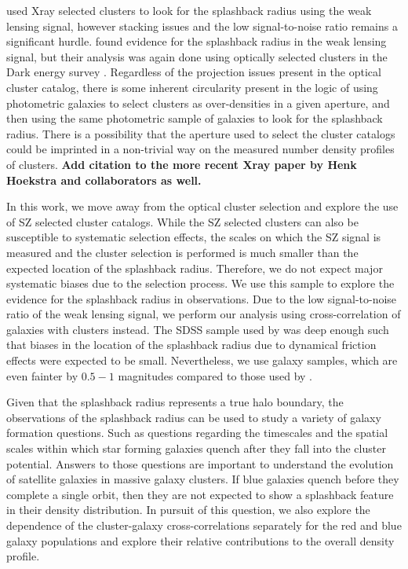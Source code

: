 \documentclass[iop, apjl, twocolappendix, numberedappendix]{emulateapj}
\begin{document}
\citet{umetsu2017lensing} used Xray selected clusters to look for
the splashback radius using the weak lensing signal, however
stacking issues and the low signal-to-noise ratio remains a significant
hurdle. \citet{chang2017splashback} found evidence for the splashback
radius in the weak lensing signal, but their analysis was again done
using optically selected clusters in the Dark energy survey
\citep{dark2005dark}. Regardless of the projection issues present in
the optical cluster catalog, there is some inherent circularity
present in the logic of using photometric galaxies to select
clusters as over-densities in a given aperture, and then using the
same photometric sample of galaxies to look for the splashback
radius. There is a possibility that the aperture used to select the
cluster catalogs could be imprinted in a non-trivial way on the measured number
density profiles of clusters. {\bf Add citation to the more recent Xray paper
by Henk Hoekstra and collaborators as well.}

In this work, we move away from the optical cluster selection and
explore the use of SZ selected cluster catalogs. While the SZ
selected clusters can also be susceptible to systematic selection
effects, the scales on which the SZ signal is measured and the
cluster selection is performed is much smaller than the expected
location of the splashback radius. Therefore, we do not expect major
systematic biases due to the selection process. We use this sample
to explore the evidence for the splashback radius in observations.
Due to the low signal-to-noise ratio of the weak lensing signal, we
perform our analysis using cross-correlation of galaxies with
clusters instead. The SDSS sample used by \citet{more2016detection}
was deep enough such that biases in the location of the splashback
radius due to dynamical friction effects were expected to be small.
Nevertheless, we use galaxy samples, which are even fainter by
$0.5-1$ magnitudes compared to those used by
\citet{more2016detection}.

Given that the splashback radius represents a true halo boundary,
the observations of the splashback radius can be used to study a
variety of galaxy formation questions. Such as questions 
regarding the timescales and the spatial scales within
which star forming galaxies quench after they fall into the cluster
potential. Answers to those questions are important to understand 
the evolution of satellite galaxies in massive galaxy clusters. 
If blue galaxies quench before
they complete a single orbit, then they are not expected to show a
splashback feature in their density distribution. In pursuit of this
question, we also explore the dependence of the cluster-galaxy
cross-correlations separately for the red and blue galaxy populations 
and explore their relative contributions to the overall density profile.
\end{document}

